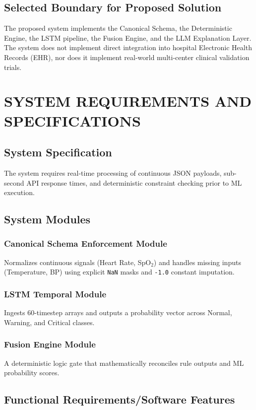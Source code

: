 \documentclass[12pt,a4paper]{report}
\begin{document}
\section{Selected Boundary for Proposed Solution}
The proposed system implements the Canonical Schema, the Deterministic Engine, the LSTM pipeline, the Fusion Engine, and the LLM Explanation Layer. 
The system does not implement direct integration into hospital Electronic Health Records (EHR), nor does it implement real-world multi-center clinical validation trials.

\chapter{SYSTEM REQUIREMENTS AND SPECIFICATIONS}

\section{System Specification}
The system requires real-time processing of continuous JSON payloads, sub-second API response times, and deterministic constraint checking prior to ML execution.

\section{System Modules}
\subsection{Canonical Schema Enforcement Module}
Normalizes continuous signals (Heart Rate, SpO$_2$) and handles missing inputs (Temperature, BP) using explicit \texttt{NaN} masks and \texttt{-1.0} constant imputation.
\subsection{LSTM Temporal Module}
Ingests 60-timestep arrays and outputs a probability vector across Normal, Warning, and Critical classes.
\subsection{Fusion Engine Module}
A deterministic logic gate that mathematically reconciles rule outputs and ML probability scores.

\section{Functional Requirements/Software Features}
\end{document}
